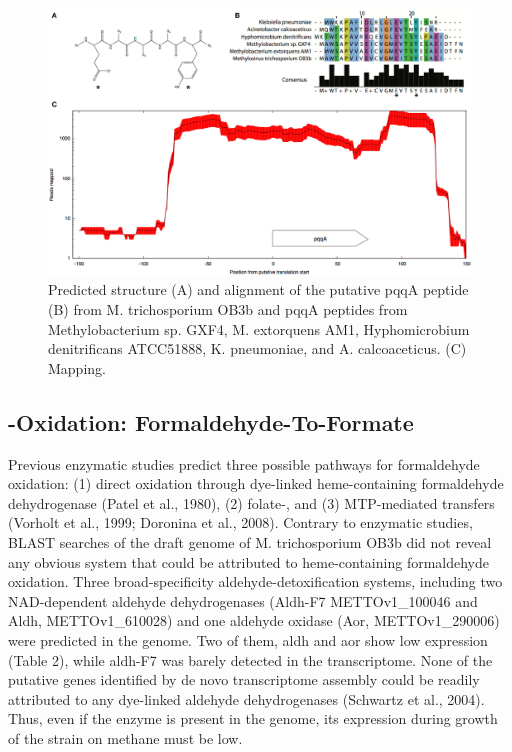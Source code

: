 \begin{figure}[H]
\centering
     \includegraphics[width=1.0\textwidth]{./tex/chapter1/figures/figure2.png}
     \begin{singlespace}
     \caption{Predicted structure
        (A) and alignment of the putative pqqA peptide
        (B) from M. trichosporium OB3b and pqqA peptides from Methylobacterium sp. GXF4, M. extorquens AM1,
            Hyphomicrobium denitrificans ATCC51888, K. pneumoniae, and A. calcoaceticus.
        (C) Mapping.}
     \end{singlespace}
     \label{fig:B_pqqA}
\end{figure}


\subsection{-Oxidation: Formaldehyde-To-Formate}
Previous enzymatic studies predict three possible pathways for formaldehyde oxidation: (1) direct oxidation through dye-linked heme-containing formaldehyde dehydrogenase (Patel et al., 1980), (2) folate-, and (3) MTP-mediated  transfers (Vorholt et al., 1999; Doronina et al., 2008).
Contrary to enzymatic studies, BLAST searches of the draft genome of M. trichosporium OB3b did not reveal any obvious system that could be attributed to heme-containing formaldehyde oxidation.
Three broad-specificity aldehyde-detoxification systems, including two NAD-dependent aldehyde dehydrogenases (Aldh-F7 METTOv1\_100046 and Aldh, METTOv1\_610028) and one aldehyde oxidase (Aor, METTOv1\_290006) were predicted in the genome.
Two of them, aldh and aor show low expression (Table 2), while aldh-F7 was barely detected in the transcriptome.
None of the putative genes identified by de novo transcriptome assembly could be readily attributed to any dye-linked aldehyde dehydrogenases (Schwartz et al., 2004).
Thus, even if the enzyme is present in the genome, its expression during growth of the strain on methane must be low.

